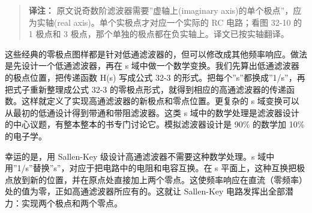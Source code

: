 \begin{quote}
\textbf{译注：} 原文说奇数阶滤波器需要''虚轴上(imaginary
axis)的单个极点''，应为实轴(real axis)。单个实极点才对应一个实际的 RC
电路；看图 32-10 的 1 极点和 3
极点，那个单独的极点都在负实轴上。译文已按实轴翻译。
\end{quote}

这些经典的零极点图样都是针对低通滤波器的，但可以修改成其他频率响应。做法是先设计一个低通滤波器，再在
s 域中做一个数学变换。我们先算出低通滤波器的极点位置，把传递函数 H(s)
写成公式 32-3 的形式。把每个''s''都换成''1/s''，再把式子重新整理成公式
32-3
的零极点形式，就得到相应的高通滤波器的传递函数。这样就定义了实现高通滤波器的新极点和零点位置。更复杂的
s 域变换可以从最初的低通设计得到带通和带阻滤波器。这类 s
域中的数学处理是滤波器设计的中心议题，有整本整本的书专门讨论它。模拟滤波器设计是
90\% 的数学加 10\% 的电子学。

幸运的是，用 Sallen-Key 级设计高通滤波器不需要这种数学处理。s
域中用''1/s''替换''s''，对应于把电路中的电阻和电容互换。在 s
平面上，这种互换把极点放到新的位置，并在原点处直接加上两个零点。这使频率响应在直流（零频率）处的值为零，正如高通滤波器所应有的。这就让
Sallen-Key 电路发挥出全部潜力：实现两个极点和两个零点。
